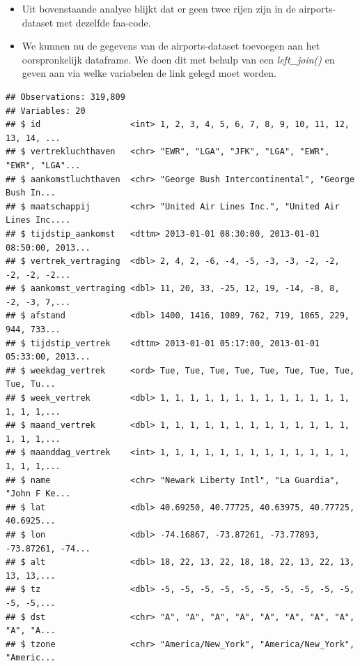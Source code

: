 \documentclass[]{tufte-book}
\newenvironment{Shaded}{}{}
\newcommand{\DataTypeTok}[1]{\textcolor[rgb]{0.56,0.13,0.00}{#1}}
\newcommand{\KeywordTok}[1]{\textcolor[rgb]{0.00,0.44,0.13}{\textbf{#1}}}
\newcommand{\NormalTok}[1]{#1}
\newcommand{\OperatorTok}[1]{\textcolor[rgb]{0.40,0.40,0.40}{#1}}
\newcommand{\StringTok}[1]{\textcolor[rgb]{0.25,0.44,0.63}{#1}}
\providecommand{\tightlist}{%
  \setlength{\itemsep}{0pt}\setlength{\parskip}{0pt}}
\begin{document}
\begin{itemize}
\tightlist
\item
  Uit bovenstaande analyse blijkt dat er geen twee rijen zijn in de airports-dataset met dezelfde faa-code.
\item
  We kunnen nu de gegevens van de airports-dataset toevoegen aan het oorspronkelijk dataframe. We doen dit met behulp van een \emph{left\_join()} en geven aan via welke variabelen de link gelegd moet worden.
\end{itemize}

\begin{Shaded}
\end{Shaded}

\begin{verbatim}
## Observations: 319,809
## Variables: 20
## $ id                  <int> 1, 2, 3, 4, 5, 6, 7, 8, 9, 10, 11, 12, 13, 14, ...
## $ vertrekluchthaven   <chr> "EWR", "LGA", "JFK", "LGA", "EWR", "EWR", "LGA"...
## $ aankomstluchthaven  <chr> "George Bush Intercontinental", "George Bush In...
## $ maatschappij        <chr> "United Air Lines Inc.", "United Air Lines Inc....
## $ tijdstip_aankomst   <dttm> 2013-01-01 08:30:00, 2013-01-01 08:50:00, 2013...
## $ vertrek_vertraging  <dbl> 2, 4, 2, -6, -4, -5, -3, -3, -2, -2, -2, -2, -2...
## $ aankomst_vertraging <dbl> 11, 20, 33, -25, 12, 19, -14, -8, 8, -2, -3, 7,...
## $ afstand             <dbl> 1400, 1416, 1089, 762, 719, 1065, 229, 944, 733...
## $ tijdstip_vertrek    <dttm> 2013-01-01 05:17:00, 2013-01-01 05:33:00, 2013...
## $ weekdag_vertrek     <ord> Tue, Tue, Tue, Tue, Tue, Tue, Tue, Tue, Tue, Tu...
## $ week_vertrek        <dbl> 1, 1, 1, 1, 1, 1, 1, 1, 1, 1, 1, 1, 1, 1, 1, 1,...
## $ maand_vertrek       <dbl> 1, 1, 1, 1, 1, 1, 1, 1, 1, 1, 1, 1, 1, 1, 1, 1,...
## $ maanddag_vertrek    <int> 1, 1, 1, 1, 1, 1, 1, 1, 1, 1, 1, 1, 1, 1, 1, 1,...
## $ name                <chr> "Newark Liberty Intl", "La Guardia", "John F Ke...
## $ lat                 <dbl> 40.69250, 40.77725, 40.63975, 40.77725, 40.6925...
## $ lon                 <dbl> -74.16867, -73.87261, -73.77893, -73.87261, -74...
## $ alt                 <dbl> 18, 22, 13, 22, 18, 18, 22, 13, 22, 13, 13, 13,...
## $ tz                  <dbl> -5, -5, -5, -5, -5, -5, -5, -5, -5, -5, -5, -5,...
## $ dst                 <chr> "A", "A", "A", "A", "A", "A", "A", "A", "A", "A...
## $ tzone               <chr> "America/New_York", "America/New_York", "Americ...
\end{verbatim}
\end{document}
